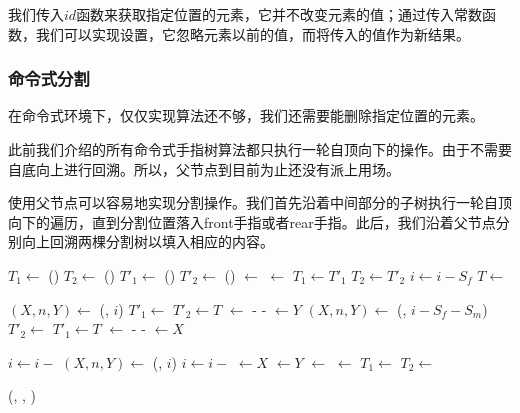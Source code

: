 \documentclass[b5paper]{ctexart}
\begin{document}
我们传入$id$函数来获取指定位置的元素，它并不改变元素的值；通过传入常数函数，我们可以实现设置，它忽略元素以前的值，而将传入的值作为新结果。

\subsubsection{命令式分割}

在命令式环境下，仅仅实现算法还不够，我们还需要能删除指定位置的元素。

此前我们介绍的所有命令式手指树算法都只执行一轮自顶向下的操作。由于不需要自底向上进行回溯。所以，父节点到目前为止还没有派上用场。

使用父节点可以容易地实现分割操作。我们首先沿着中间部分的子树执行一轮自顶向下的遍历，直到分割位置落入front手指或者rear手指。此后，我们沿着父节点分别向上回溯两棵分割树以填入相应的内容。

\begin{algorithmic}
  \State $T_1 \gets$ ()
  \State $T_2 \gets$ ()
   
    \State $T'_1 \gets$ ()
    \State $T'_2 \gets$ ()
    \State {} $\gets$ 
    \State {} $\gets$ 
    \State {}
    \State {}
    \State $T_1 \gets T'_1$
    \State $T_2 \gets T'_2$
    \State $i \gets i - S_f$
    \State $T \gets$ 
  \EndWhile

    \State $(X, n, Y) \gets$ (, $i$)
    \State $T'_1 \gets$ 
    \State $T'_2 \gets T$
    \State {} $\gets$  -  - 
    \State {} $\gets Y$
    \State $(X, n, Y) \gets$ (, $i - S_f - S_m$)
    \State $T'_2 \gets$ 
    \State $T'_1 \gets T$
    \State {} $\gets$  -  - 
    \State {} $\gets X$
  \EndIf
  \State {}
  \State {}

  \State $i \gets i -$ 
   
    \State $(X, n, Y) \gets$ (, $i$)
    \State $i \gets i -$ 
    \State {} $\gets X$
    \State {} $\gets Y$
    \State {} $\gets$ 
    \State {} $\gets$ 
    \State $T_1 \gets$ 
    \State $T_2 \gets$ 
  \EndWhile

  \State \Return (, , )
\EndFunction
\end{algorithmic}
\end{document}
